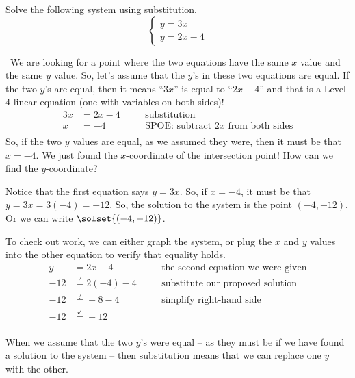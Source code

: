 
\begin{boxex}
Solve the following system using substitution.
\[
\left\{%
\begin{array}{l}
y=3x\\
y=2x-4
\end{array}
\right.
\] 

\exsoln\ We are looking for a point where the two equations have the same $x$ value and the same $y$ value. So, let's assume that the $y$'s in these two equations  are equal. If the two $y$'s are equal, then it means ``$3x$'' is equal to ``$2x-4$'' and that is a Level 4 linear equation (one with variables on both sides)!
\[\begin{aligned}
3x &= 2x -4
&& \quad\text{substitution}\\
x &= -4
&& \quad\text{SPOE: subtract $2x$ from both sides}\\
\end{aligned}\]
So, if the two $y$ values are equal, as we assumed they were, then it must be that $x=-4$. We just found the $x$-coordinate of the intersection point! How can we find the $y$-coordinate?

Notice that the first equation says $y = 3x$. So, if $x=-4$, it must be that $y = 3x = 3(-4) = -12$. So, the solution to the system is the point $(-4, -12)$. Or we can write $\solset{(-4,-12)}$.

To check out work, we can either graph the system, or plug the $x$ and $y$ values into the other equation to verify that equality holds.
\[\begin{aligned}
y &= 2x -4
&& \quad\text{the second equation we were given}\\
-12 &\overset{?}{=} 2(-4)-4
&& \quad\text{substitute our proposed solution}\\
-12 &\overset{?}{=} -8-4
&& \quad\text{simplify right-hand side}\\
-12 &\overset{\checkmark}{=} -12
&& \quad\text{}\\
\end{aligned}\]
\end{boxex}

When we assume that the two $y$'s were equal -- as they must be if we have found a solution to the system -- then substitution means that we can replace one $y$ with the other.

